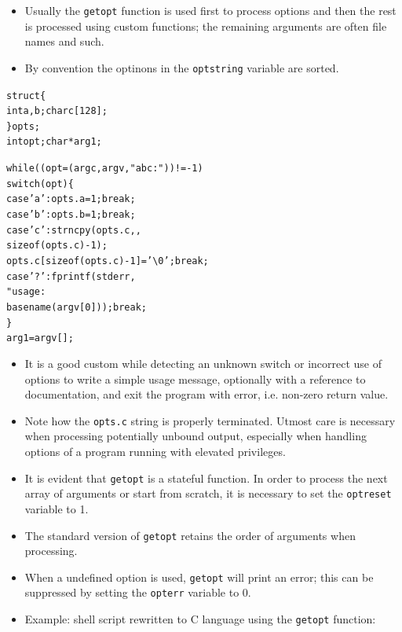 \begin{itemize}
\item Usually the \texttt{getopt} function is used first to process options
and then the rest is processed using custom functions; the remaining arguments
are often file names and such.
\item By convention the optinons in the \texttt{optstring} variable are sorted.
\end{itemize}


\begin{slide}
\setlength{\baselineskip}{0.8\baselineskip}
\begin{alltt}
struct \{
    int a, b; char c[128]; 
\} opts; 
int opt; char *arg1; 

while((opt = (argc, argv, "abc:")) != -1) 
    switch(opt) \{ 
        case 'a': opts.a = 1; break; 
        case 'b': opts.b = 1; break; 
        case 'c': strncpy(opts.c, ,
            sizeof (opts.c) - 1);
            opts.c[sizeof (opts.c) - 1] = '\textbackslash0'; break; 
        case '?': fprintf(stderr, 
            "usage: %
            basename(argv[0])); break; 
    \} 
arg1 = argv[];
\end{alltt}
\end{slide}

\begin{itemize}
\item It is a good custom while detecting an unknown switch or incorrect use
of options to write a simple usage message, optionally with a reference to documentation,
and exit the program with error, i.e. non-zero return value.
\item Note how the \texttt{opts.c} string is properly terminated. Utmost care
is necessary when processing potentially unbound output, especially when
handling options of a program running with elevated privileges.
\item It is evident that \texttt{getopt} is a stateful function. In order to
process the next array of arguments or start from scratch, it is necessary to
set the \texttt{optreset} variable to 1.
\item The standard version of \texttt{getopt} retains the order of arguments when
processing.
\item When a undefined option is used, \texttt{getopt} will print an error;
this can be suppressed by setting the \texttt{opterr} variable to 0.
\item \label{GETOPT} Example: shell script 
rewritten to C language using the \texttt{getopt} function:
\end{itemize}

